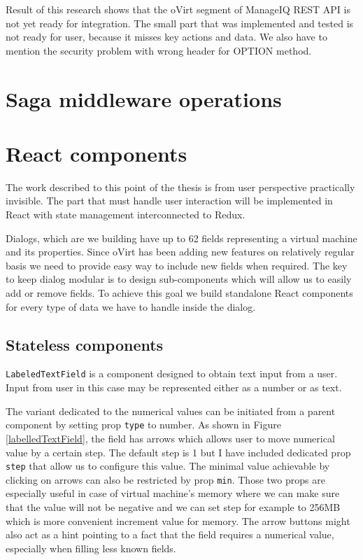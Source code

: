 Result of this research shows that the oVirt segment of ManageIQ REST API is not yet ready for integration. The small part that was implemented and tested is not ready for user, because it misses key actions and data. We also have to mention the security problem with wrong header for OPTION method.

\section{Saga middleware operations}


\section{React components}
The work described to this point of the thesis is from user perspective practically invisible. The part that must handle user interaction will be implemented in React with state management interconnected to Redux. 

Dialogs, which are we building have up to 62 fields representing a virtual machine and its properties. Since oVirt has been adding new features on relatively regular basis we need to provide easy way to include new fields when required. The key to keep dialog modular is to design sub-components which will allow us to easily add or remove fields. To achieve this goal we build standalone React components for every type of data we have to handle inside the dialog.

\subsection{Stateless components}
\texttt{LabeledTextField} is a component designed to obtain text input from a user. Input from user in this case may be represented either as a number or as text.

The variant dedicated to the numerical values can be initiated from a parent component by setting prop \texttt{type} to number. As shown in Figure~ \ref{labelledTextField}, the field has arrows which allows user to move numerical value by a certain step. The default step is 1 but I have included dedicated prop \texttt{step} that allow us to configure this value. The minimal value achievable by clicking on arrows can also be restricted by prop \texttt{min}. Those two props are especially useful in case of virtual machine's memory where we can make sure that the value will not be negative and we can set step for example to 256MB which is more convenient increment value for memory. 
The arrow buttons might also act as a hint pointing to a fact that the field requires a numerical value, especially when filling less known fields.

